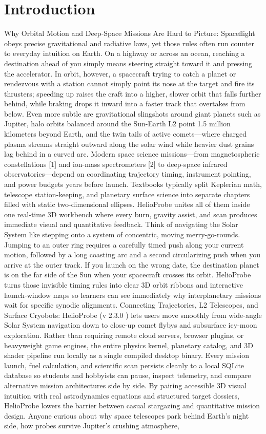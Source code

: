 \documentclass[10pt,letterpaper]{article}
\begin{document}
\section{Introduction}
Why Orbital Motion and Deep-Space Missions Are Hard to Picture: Spaceflight obeys precise gravitational and radiative laws, yet those rules often run counter to everyday intuition on Earth. On a highway or across an ocean, reaching a destination ahead of you simply means steering straight toward it and pressing the accelerator. In orbit, however, a spacecraft trying to catch a planet or rendezvous with a station cannot simply point its nose at the target and fire its thrusters; speeding up raises the craft into a higher, slower orbit that falls further behind, while braking drops it inward into a faster track that overtakes from below. Even more subtle are gravitational slingshots around giant planets such as Jupiter, halo orbits balanced around the Sun-Earth L2 point 1.5 million kilometers beyond Earth, and the twin tails of active comets---where charged plasma streams straight outward along the solar wind while heavier dust grains lag behind in a curved arc. Modern space science missions---from magnetospheric constellations [1] and ion-mass spectrometers [2] to deep-space infrared observatories---depend on coordinating trajectory timing, instrument pointing, and power budgets years before launch. Textbooks typically split Keplerian math, telescope station-keeping, and planetary surface science into separate chapters filled with static two-dimensional ellipses. HelioProbe unites all of them inside one real-time 3D workbench where every burn, gravity assist, and scan produces immediate visual and quantitative feedback. Think of navigating the Solar System like stepping onto a system of concentric, moving merry-go-rounds. Jumping to an outer ring requires a carefully timed push along your current motion, followed by a long coasting arc and a second circularizing push when you arrive at the outer track. If you launch on the wrong date, the destination planet is on the far side of the Sun when your spacecraft crosses its orbit. HelioProbe turns those invisible timing rules into clear 3D orbit ribbons and interactive launch-window maps so learners can see immediately why interplanetary missions wait for specific synodic alignments. Connecting Trajectories, L2 Telescopes, and Surface Cryobots: HelioProbe (v 2.3.0 ) lets users move smoothly from wide-angle Solar System navigation down to close-up comet flybys and subsurface icy-moon exploration. Rather than requiring remote cloud servers, browser plugins, or heavyweight game engines, the entire physics kernel, planetary catalog, and 3D shader pipeline run locally as a single compiled desktop binary. Every mission launch, fuel calculation, and scientific scan persists cleanly to a local SQLite database so students and hobbyists can pause, inspect telemetry, and compare alternative mission architectures side by side. By pairing accessible 3D visual intuition with real astrodynamics equations and structured target dossiers, HelioProbe lowers the barrier between casual stargazing and quantitative mission design. Anyone curious about why space telescopes park behind Earth's night side, how probes survive Jupiter's crushing atmosphere, 
\end{document}
